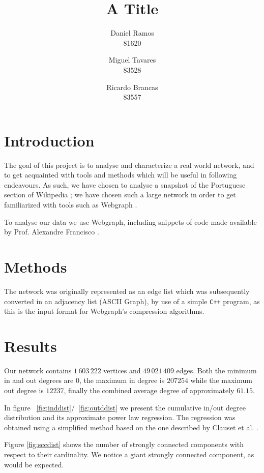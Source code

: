 \documentclass[9pt,a4paper,twocolumn]{article}
\title{A Title}
\author{Daniel Ramos \\ 81620 \and Miguel Tavares \\ 83528 \and Ricardo Brancas  \\ 83557}
\begin{document}
\maketitle

\section{Introduction}
The goal of this project is to analyse and characterize a real world network, and to  get 
acquainted with tools and methods which will be useful in following endeavours.
As such, we have chosen to analyse a snapshot of the Portuguese section of Wikipedia \cite{dataset};
we have chosen such a large network in order to get familiarized with tools such as Webgraph \cite{webgraph}.

To analyse our data we use Webgraph, including snippets of code made available
by Prof. Alexandre Francisco \cite{aplf}.


\section{Methods}
The network was originally represented as an edge list which was subsequently converted in an adjacency list (ASCII Graph), by use of a simple \texttt{C++} program, as this is the input
format for Webgraph's compression algorithms. 





\section{Results}

Our network contains $1\,603\,222$ vertices and $49\,021\,409$ edges. Both the minimum in and out degrees are $0$, the maximum in degree is $207254$ while the maximum out degree is $12237$, finally the combined average degree of approximately $61.15$.
\vspace{1\baselineskip}

In figure ~\ref{fig:inddist}/~\ref{fig:outddist} we present the cumulative in/out degree distribution and its approximate power law regression. The regression was obtained using a simplified method based on the one described by Clauset et al. \cite{Clauset2009}.

Figure \ref{fig:sccdist} shows the number of strongly connected components with respect to their cardinality. We notice a giant strongly connected component, as would be expected.
\end{document}
